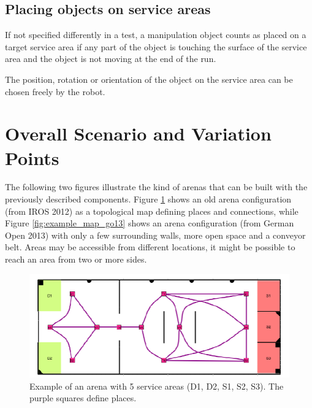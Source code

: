 \subsection{Placing objects on service areas}
If not specified differently in a test, a manipulation object counts as placed on a target service area if any part of the object is touching the surface of the service area and the object is not moving at the end of the run.
\par
The position, rotation or orientation of the object on the service area can be chosen freely by the robot.

\section{Overall Scenario and Variation Points}
The following two figures illustrate the kind of arenas that can be built with the previously described components. Figure \ref{fig:example_map} shows an old arena configuration (from IROS 2012) as a topological map defining places and connections, while Figure \ref{fig:example_map_go13} shows an arena configuration (from German Open 2013) with only a few surrounding walls, more open space and a conveyor belt. 
Areas may be accessible from different locations, it might be possible to reach an area from two or more sides.

\begin{figure}
\includegraphics[width= \textwidth ]{../images/example_map.png}
\caption{Example of an arena with 5 service areas (D1, D2, S1, S2, S3). The purple squares define places.}
\label{fig:example_map}
\end{figure}

